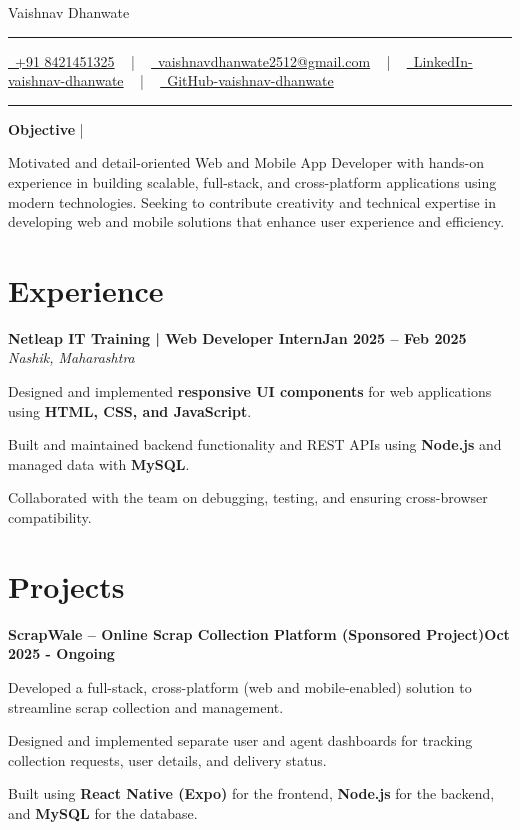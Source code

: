 \documentclass[letterpaper,10pt]{article}
\newcommand{\documentTitle}[2]{
  \begin{center}
    {\Huge\color{accentTitle} #1}
    \vspace{10pt}
    {\color{accentLine} \hrule}
    \vspace{2pt}
    \footnotesize{#2}
    \vspace{2pt}
    {\color{accentLine} \hrule}
  \end{center}
}
\newcommand{\tinysection}[1]{
  \phantomsection
  \addcontentsline{toc}{section}{#1}
  {\large{\bfseries\color{accentText}#1} {\color{accentLine} |}}
}
\newcommand{\heading}[2]{
  \hspace{10pt}#1\hfill#2\\
}
\newcommand{\headingBf}[2]{
  \heading{\textbf{#1}}{\textbf{#2}}
}
\newcommand{\headingIt}[2]{
  \heading{\textit{#1}}{\textit{#2}}
}
\newenvironment{resume_list}{
  \vspace{-7pt}
  \begin{itemize}[itemsep=-2px, parsep=1pt, leftmargin=30pt]
}{
  \end{itemize}
}
\begin{document}
\documentTitle{Vaishnav Dhanwate}{
  \href{tel:+918421451325}{
    \raisebox{-0.05\height}{\faPhone}\ +91 8421451325} ~ | ~
  \href{mailto:vaishnavdhanwate2512@gmail.com}{
    \raisebox{-0.15\height}{\faEnvelope}\ vaishnavdhanwate2512@gmail.com} ~ | ~
  \href{https://www.linkedin.com/in/vaishnav-dhanwate}{
    \raisebox{-0.15\height}{\faLinkedin}\ LinkedIn-vaishnav-dhanwate} ~ | ~
  \href{https://github.com/vaishnavSD}{
    \raisebox{-0.15\height}{\faGithub}\ GitHub-vaishnav-dhanwate}
}

\tinysection{Objective}

Motivated and detail-oriented Web and Mobile App Developer with hands-on experience in building scalable, full-stack, and cross-platform applications using modern technologies. Seeking to contribute creativity and technical expertise in developing web and mobile solutions that enhance user experience and efficiency.

\vspace{10pt}
\section{Experience}

\headingBf{Netleap IT Training | Web Developer Intern}{Jan 2025 -- Feb 2025}
\headingIt{Nashik, Maharashtra}{}
\begin{resume_list}
  \item Designed and implemented \textbf{responsive UI components} for web applications using \textbf{HTML, CSS, and JavaScript}.
  \item Built and maintained backend functionality and REST APIs using \textbf{Node.js} and managed data with \textbf{MySQL}.
  \item Collaborated with the team on debugging, testing, and ensuring cross-browser compatibility.
\end{resume_list}

\vspace{10pt}
\section{Projects}

\headingBf{ScrapWale -- Online Scrap Collection Platform (Sponsored Project)}{Oct 2025 - Ongoing}
\begin{resume_list}
  \item Developed a full-stack, cross-platform (web and mobile-enabled) solution to streamline scrap collection and management.
  \item Designed and implemented separate user and agent dashboards for tracking collection requests, user details, and delivery status.
  \item Built using \textbf{React Native (Expo)} for the frontend, \textbf{Node.js} for the backend, and \textbf{MySQL} for the database.
\end{resume_list}
\end{document}
